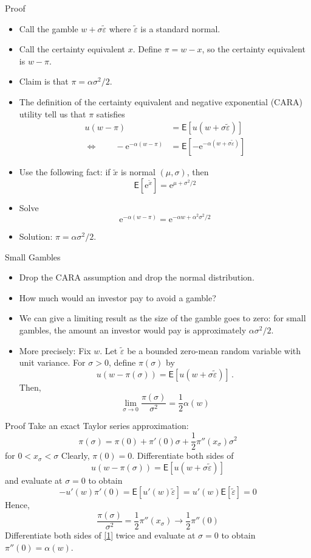 \documentclass[10pt]{beamer}
\newcommand{\bi}{\begin{itemize}}
\newcommand{\ei}{\end{itemize}}
\newcommand{\im}{\item}
\newcommand{\E}{\mathrm{e}}
\newcommand{\mye}{\ensuremath{\mathsf{E}}}
\newcommand{\bq}{\begin{equation}}
\newcommand{\eq}{\end{equation}}
\newcommand{\tve}{\tilde{\varepsilon}}
\begin{document}
\begin{frame}{Proof}
  \bi
   \im Call the gamble $w + \sigma \tve$ where $\tve$ is a standard normal.
   \im Call the certainty equivalent $x$.  Define $\pi = w-x$, so the certainty equivalent is $w-\pi$.
   \im Claim is that $\pi = \alpha\sigma^2/2$.
   \pause
   \im The definition of the certainty equivalent and negative exponential (CARA) utility tell us that $\pi$ satisfies
  \begin{align*}
  u(w-\pi) &= \mye\left[u(w+\sigma\tilde{\varepsilon})\right] \\
   \Leftrightarrow \qquad -\E^{-\alpha(w-\pi)} &= \mye\left[-\E^{-\alpha(w+\sigma\tilde{\varepsilon})}\right]
  \end{align*} 
  \ei
\end{frame} 

\begin{frame}[plain]
  \bi
  \im Use the following fact: if $\tilde{x}$ is normal $(\mu,\sigma)$, then 
  $$\mye\left[\E^{\tilde{x}}\right] = \E^{\mu + \sigma^2/2}$$
  \pause
  \im Solve
  $$\E^{-\alpha(w-\pi)} = \E^{-\alpha w+ \alpha^2\sigma^2/2}$$
  \pause
  \im Solution: $\pi = \alpha\sigma^2/2$.
  \ei
  \end{frame}

\begin{frame}{Small Gambles}
\bi
\im Drop the CARA assumption and drop the normal distribution.\im How much would an investor pay to avoid a gamble?
\im We can give a limiting result as the size of the gamble goes to zero:  for small gambles, the amount an investor would pay is approximately $\alpha\sigma^2/2$.
\im More precisely:  Fix $w$.  Let $\tve$ be a bounded zero-mean random variable with unit variance.  For $\sigma>0$, define $\pi(\sigma)$ by 
$$u(w - \pi(\sigma)) = \mye[u(w+\sigma\tve)]\,.$$
Then,
$$\lim_{\sigma \rightarrow 0} \frac{\pi(\sigma)}{\sigma^2} = \frac{1}{2}\alpha(w)$$
\ei
\end{frame}


\begin{frame}{Proof}
Take an exact Taylor series approximation:
$$\pi(\sigma)= \pi(0) + \pi'(0)\sigma + \frac{1}{2}\pi''(x_\sigma)\sigma^2$$
for $0<x_\sigma<\sigma$
Clearly, $\pi(0)=0$.  Differentiate both sides of 
\bq\tag{$\star$}\label{1}
u(w - \pi(\sigma)) = \mye[u(w+\sigma\tve)]
\eq
and evaluate at $\sigma=0$ to obtain
$$-u'(w)\pi'(0) = \mye[u'(w)\tve] = u'(w)\mye[\tve] = 0$$
Hence,
$$\frac{\pi(\sigma)}{\sigma^2} = \frac{1}{2}\pi''(x_\sigma) \rightarrow \frac{1}{2}\pi''(0)$$
Differentiate both sides of \eqref{1}
twice and evaluate at $\sigma=0$ to obtain $\pi''(0) = \alpha(w)$.
\end{frame}
\end{document}
